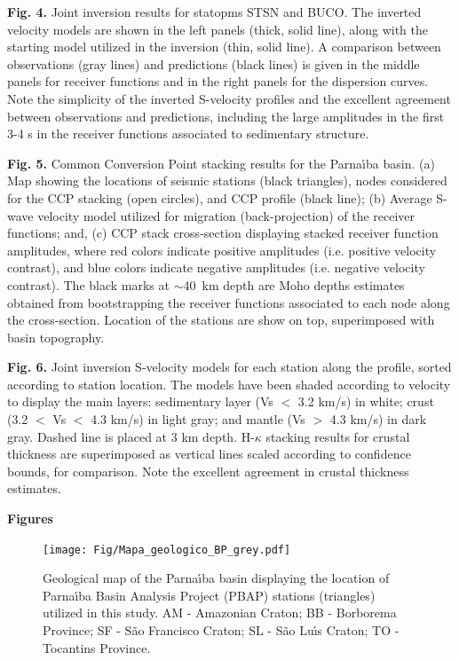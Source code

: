 \documentclass[manuscript,11pt]{geophysics}
\begin{document}
\textbf{Fig. 4.} Joint inversion results for statopms STSN and BUCO. The inverted velocity models are shown in the left panels (thick, solid line), along with the starting model utilized in the inversion (thin, solid line). A comparison between observations (gray lines) and predictions (black lines) is given in the middle panels for receiver functions and in the right panels for the dispersion curves. Note the simplicity of the inverted S-velocity profiles and the excellent agreement between observations and predictions, including the large amplitudes in the first 3-4 s in the receiver functions associated to sedimentary structure.

\textbf{Fig. 5.} Common Conversion Point stacking results for the Parna\'{\i}ba basin. (a) Map showing the locations of seismic stations (black triangles), nodes considered for the CCP stacking (open circles), and CCP profile (black line); (b) Average S-wave velocity model utilized for migration (back-projection) of the receiver functions; and, (c) CCP stack cross-section displaying stacked receiver function amplitudes, where red colors indicate positive amplitudes (i.e. positive velocity contrast), and blue colors indicate negative amplitudes (i.e. negative velocity contrast). The black marks at $\sim$40~km depth are Moho depths estimates obtained from bootstrapping the receiver functions associated to each node along the cross-section. Location of the stations are show on top, superimposed with basin topography.
    
\textbf{Fig. 6.} Joint inversion S-velocity models for each station along the profile, sorted according to station location. The models have been shaded according to velocity to display the main layers: sedimentary layer (Vs $<$ 3.2 km/s) in white; crust (3.2 $<$ Vs $<$ 4.3 km/s) in light gray; and mantle (Vs $>$ 4.3 km/s) in dark gray. Dashed line is placed at 3 km depth. H-$\kappa$ stacking results for crustal thickness are superimposed as vertical lines scaled according to confidence bounds, for comparison. Note the excellent agreement in crustal thickness estimates.

\pagebreak

\begin{flushleft}
\textbf{\LARGE Figures}
\end{flushleft}


\begin{figure}[!ht]
\begin{center}
\texttt{[image: Fig/Mapa\_geologico\_BP\_grey.pdf]}
\caption{Geological map of the Parna\'{\i}ba basin displaying the location of Parna\'{\i}ba Basin Analysis Project (PBAP) stations (triangles) utilized in this study. AM - Amazonian Craton; BB - Borborema Province; SF - S\~ao Francisco Craton; SL - S\~ao Lu\'{\i}s Craton; TO - Tocantins Province.}
\label{mapa_estacoes_geologico}
\end{center}
\end{figure}
\end{document}
